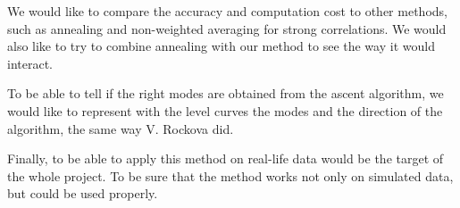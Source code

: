 \documentclass{article}
\numberwithin{equation}{section}
\begin{document}
We would like to compare the accuracy and computation cost to other methods, such as annealing and non-weighted averaging for strong correlations. We would also like to try to combine annealing with our method to see the way it would interact.

To be able to tell if the right modes are obtained from the ascent algorithm, we would like to represent with the level curves the modes and the direction of the algorithm, the same way V. Rockova did.

Finally, to be able to apply this method on real-life data would be the target of the whole project. To be sure that the method works not only on simulated data, but could be used properly.
\newpage


\end{document}
